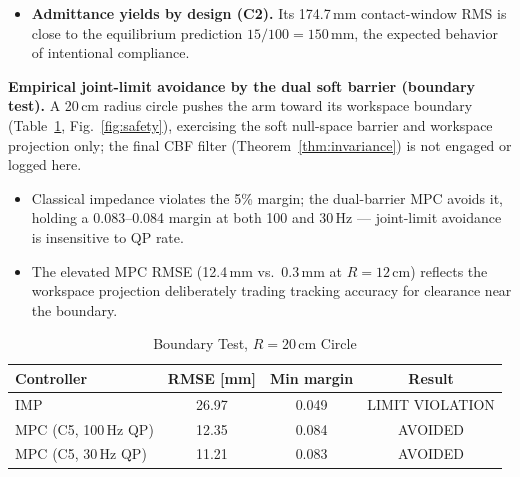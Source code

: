 \documentclass[journal]{IEEEtran}
\begin{document}
\begin{itemize}[leftmargin=*,itemsep=1pt,topsep=2pt]
Raising the QP rate from 100 to 500\,Hz mainly shrinks the
zero-order-hold transient; adding the Kalman estimator mainly removes
the steady-state error. C7 combines both and gives the lowest
contact-window RMS, peak deflection, and steady-state error of any
controller; its total RMS (12.6\,mm, averaged over the whole cycle) is
marginally higher than C4/C5's (11.4\,mm), since the faster rate
sharpens the contact transient without improving free-motion tracking.
\item \textbf{Admittance yields by design (C2).} Its 174.7\,mm
contact-window RMS is close to the equilibrium prediction
$15/100=150$\,mm, the expected behavior of intentional compliance.
\end{itemize}

\textbf{Empirical joint-limit avoidance by the dual soft barrier
(boundary test).}
A 20\,cm radius circle pushes the arm toward its workspace boundary
(Table~\ref{tab:safety}, Fig.~\ref{fig:safety}), exercising the soft
null-space barrier and workspace projection only; the final CBF filter
(Theorem~\ref{thm:invariance}) is not engaged or logged here.

\begin{itemize}[leftmargin=*,itemsep=1pt,topsep=2pt]
\item Classical impedance violates the 5\% margin; the dual-barrier MPC
avoids it, holding a 0.083--0.084 margin at both 100 and 30\,Hz ---
joint-limit avoidance is insensitive to QP rate.
\item The elevated MPC RMSE (12.4\,mm vs.\ 0.3\,mm at $R=12$\,cm)
reflects the workspace projection deliberately trading tracking
accuracy for clearance near the boundary.
\end{itemize}

\begin{table}[!t]
\caption{Boundary Test, $R=20$\,cm Circle}
\label{tab:safety}
\renewcommand{\arraystretch}{1.0}
\centering
\footnotesize
\setlength{\tabcolsep}{2.5pt}
\footnotesize
\begin{tabular}{@{}lccc@{}}
\toprule
\textbf{Controller} & \textbf{RMSE [mm]} & \textbf{Min margin} & \textbf{Result}\\
\midrule
IMP         & 26.97 & 0.049 & \textsf{LIMIT VIOLATION}\\
MPC (C5, 100\,Hz QP) & 12.35 & 0.084 & \textsf{AVOIDED}\\
MPC (C5, 30\,Hz QP)  & 11.21 & 0.083 & \textsf{AVOIDED}\\
\bottomrule
\end{tabular}
\end{table}
\end{document}
